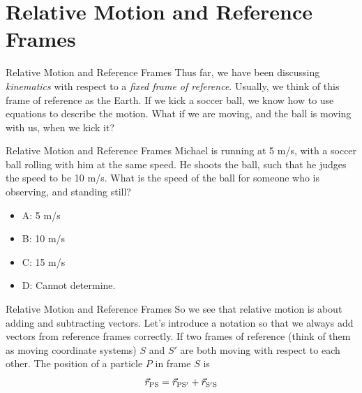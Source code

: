 \documentclass{beamer}
\begin{document}
\section{Relative Motion and Reference Frames}

\begin{frame}{Relative Motion and Reference Frames}
Thus far, we have been discussing \textit{kinematics} with respect to a \textit{fixed frame of reference}.  Usually, we think of this frame of reference as the Earth.  If we kick a soccer ball, we know how to use equations to describe the motion.  What if we are moving, and the ball is moving with us, when we kick it?
\end{frame}

\begin{frame}{Relative Motion and Reference Frames}
Michael is running at 5 m/s, with a soccer ball rolling with him at the same speed.  He shoots the ball, such that he judges the speed to be 10 m/s.  What is the speed of the ball for someone who is observing, and standing still?
\begin{itemize}
\item A: 5 m/s
\item B: 10 m/s
\item C: 15 m/s
\item D: Cannot determine.
\end{itemize}
\end{frame}

\begin{frame}{Relative Motion and Reference Frames}
So we see that relative motion is about adding and subtracting vectors.  Let's introduce a notation so that we always add vectors from reference frames correctly.  If two frames of reference (think of them as moving coordinate systems) $S$ and $S'$ are both moving with respect to each other.  The position of a particle $P$ in frame $S$ is \\
\begin{equation}
\vec{r}_{\rm PS} = \vec{r}_{\rm PS'} + \vec{r}_{\rm S'S}
\end{equation}
\end{frame}
\end{document}
